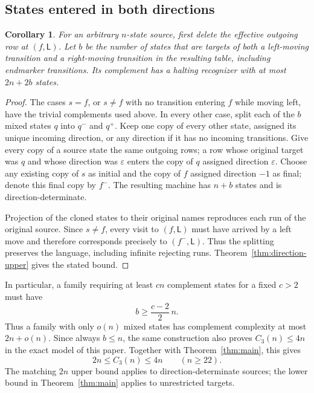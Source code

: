 \documentclass[11pt,a4paper]{article}
\newtheorem{corollary}[theorem]{Corollary}
\theoremstyle{definition}
\theoremstyle{remark}
\newcommand{\LL}{\mathsf L}
\begin{document}
\subsection{States entered in both directions}

\begin{corollary}\label{cor:mixed-directions}
For an arbitrary $n$-state source, first delete the effective outgoing row at
$(f,\LL)$. Let $b$ be the number of states that are targets of both a
left-moving transition and a right-moving transition in the resulting table,
including endmarker transitions. Its complement has a halting recognizer
with at most $2n+2b$ states.
\end{corollary}

\begin{proof}
The cases $s=f$, or $s\ne f$ with no transition entering $f$ while moving
left, have the trivial complements used above. In every other case, split
each of the $b$ mixed states $q$ into $q^-$ and $q^+$. Keep one copy of every
other state, assigned its unique incoming direction, or any direction if it
has no incoming transitions. Give every copy of a source state the same
outgoing rows; a row whose original target was $q$ and whose direction was
$\varepsilon$ enters the copy of $q$ assigned direction $\varepsilon$.
Choose any existing copy of $s$ as initial and the copy of $f$
assigned direction $-1$ as final; denote this final copy by $f^-$. The resulting machine has $n+b$ states and is
direction-determinate.

Projection of the cloned states to their original names reproduces each
run of the original source. Since $s\ne f$, every visit to $(f,\LL)$
must have arrived by a left move and therefore corresponds precisely to
$(f^-,\LL)$. Thus the splitting preserves the language, including infinite
rejecting runs. Theorem~\ref{thm:direction-upper} gives the stated bound.
\end{proof}

In particular, a family requiring at least $cn$ complement states for a
fixed $c>2$ must have
\[
  b\ge \frac{c-2}{2}\,n.
\]
Thus a family with only $o(n)$ mixed states has complement complexity
at most $2n+o(n)$. Since always $b\le n$, the same construction
also proves $C_3(n)\le4n$ in the exact model of this paper. Together
with Theorem~\ref{thm:main}, this gives
\[
 2n\le C_3(n)\le4n\qquad(n\ge22).
\]
The matching $2n$ upper bound applies to direction-determinate sources;
the lower bound in Theorem~\ref{thm:main} applies to unrestricted targets.
\end{document}
